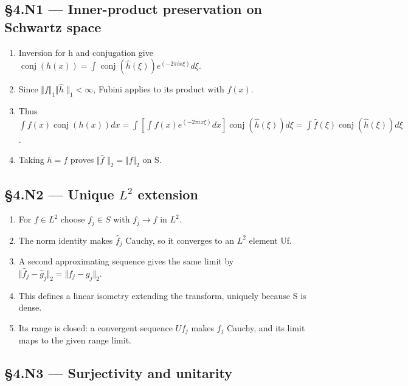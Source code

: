 \documentclass[preprint,12pt,aps,pra,showkeys,amsmath,amssymb,superscriptaddress,floatfix]{revtex4-2}
\theoremstyle{definition}
\theoremstyle{remark}
\begin{document}
\subsection{§4.N1 --- Inner-product preservation on Schwartz
space}\label{n1-inner-product-preservation-on-schwartz-space}

\begin{enumerate}
\def\labelenumi{\arabic{enumi}.}
\item
  Inversion for h and conjugation give
  \(\operatorname{conj} (h(x))=\int \operatorname{conj} (\widehat h(\xi ))e^{(-2\pi ix\xi )}d\xi\).
\item
  Since \(\Vert f\Vert _{1}\Vert \widehat h\) \(\Vert _{1}<\infty\),
  Fubini applies to its product with \(f(x)\).
\item
  Thus
  \(\int f(x)\operatorname{conj} (h(x))dx=\int [\int f(x)e^{(-2\pi ix\xi )}dx]\operatorname{conj} (\widehat h(\xi ))d\xi =\int \widehat f(\xi )\operatorname{conj} (\widehat h(\xi ))d\xi\).
\item
  Taking \(h=f\) proves \(\Vert \widehat f\)
  \(\Vert _{2}=\Vert f\Vert _{2}\) on S.
\end{enumerate}

\subsection{\texorpdfstring{§4.N2 --- Unique \(L^{2}\)
extension}{§4.N2 --- Unique L\^{}\{2\} extension}}\label{n2-unique-l2-extension}

\begin{enumerate}
\def\labelenumi{\arabic{enumi}.}
\item
  For \(f\in L^{2}\) choose \(f_j\in S\) with \(f_j\to f\) in \(L^{2}\).
\item
  The norm identity makes \(\widehat f_j\) Cauchy, so it converges to an
  \(L^{2}\) element Uf.
\item
  A second approximating sequence gives the same limit by
  \(\Vert \widehat f_j-\widehat g_j\Vert _{2}=\Vert f_j-g_j\Vert _{2}\).
\item
  This defines a linear isometry extending the transform, uniquely
  because S is dense.
\item
  Its range is closed: a convergent sequence \(Uf_j\) makes \(f_j\)
  Cauchy, and its limit maps to the given range limit.
\end{enumerate}

\subsection{§4.N3 --- Surjectivity and
unitarity}\label{n3-surjectivity-and-unitarity}
\end{document}

